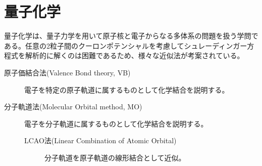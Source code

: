 \section{量子化学}

量子化学は、量子力学を用いて原子核と電子からなる多体系の問題を扱う学問である。任意の2粒子間のクーロンポテンシャルを考慮してシュレーディンガー方程式を解析的に解くのは困難であるため、様々な近似法が考案されている。
\begin{description}
    \item[原子価結合法(Valence Bond theory, VB)] 電子を特定の原子軌道に属するものとして化学結合を説明する。
    \item[分子軌道法(Molecular Orbital method, MO)] 電子を分子軌道に属するものとして化学結合を説明する。
    \begin{description}
        \item[LCAO法(Linear Combination of Atomic Orbital)] 分子軌道を原子軌道の線形結合として近似。
    \end{description}
\end{description}

